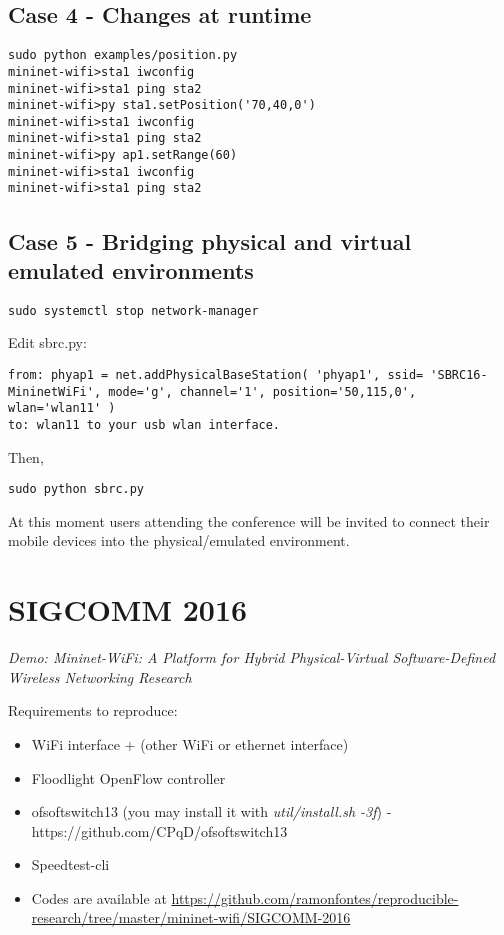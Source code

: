 \subsection{Case 4 - Changes at runtime}
\begin{verbatim}
sudo python examples/position.py  
mininet-wifi>sta1 iwconfig   
mininet-wifi>sta1 ping sta2  
mininet-wifi>py sta1.setPosition('70,40,0')  
mininet-wifi>sta1 iwconfig  
mininet-wifi>sta1 ping sta2  
mininet-wifi>py ap1.setRange(60)  
mininet-wifi>sta1 iwconfig  
mininet-wifi>sta1 ping sta2  
\end{verbatim}

\subsection{Case 5 - Bridging physical and virtual emulated environments}

\begin{verbatim}
sudo systemctl stop network-manager
\end{verbatim}

Edit sbrc.py:

\begin{verbatim}
from: phyap1 = net.addPhysicalBaseStation( 'phyap1', ssid= 'SBRC16-MininetWiFi', mode='g', channel='1', position='50,115,0', wlan='wlan11' )  
to: wlan11 to your usb wlan interface.
\end{verbatim}

Then,

\begin{verbatim}
sudo python sbrc.py
\end{verbatim}

At this moment users attending the conference will be invited to connect their mobile devices into the physical/emulated environment.

\section{SIGCOMM 2016}{\label{sec:sigcomm2016}}
\textit{Demo: Mininet-WiFi: A Platform for Hybrid Physical-Virtual Software-Defined Wireless Networking Research}

Requirements to reproduce:
\begin{itemize}
\item WiFi interface + (other WiFi or ethernet interface)
\item Floodlight OpenFlow controller
\item ofsoftswitch13 (you may install it with \textit{util/install.sh -3f}) - https://github.com/CPqD/ofsoftswitch13
\item Speedtest-cli
\item Codes are available at \url{https://github.com/ramonfontes/reproducible-research/tree/master/mininet-wifi/SIGCOMM-2016}
\end{itemize}


